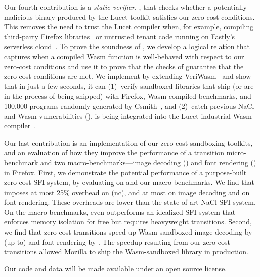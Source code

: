 %
Our fourth contribution is a \emph{static verifier}, \verifname, that checks
whether a potentially malicious binary produced by the Lucet toolkit
satisfies our zero-cost conditions.
%
This removes the need to trust the Lucet compiler when, for example,
compiling third-party Firefox libraries~\cite{rlbox} or untrusted tenant code
running on Fastly's serverless cloud~\cite{lucet-talk}.
%
To prove the soundness of \verifname, we develop a logical relation that
captures when a compiled Wasm function is well-behaved with respect
to our zero-cost conditions and use it to prove that the checks of
\verifname{} guarantee that the zero-cost conditions are met.
%
We implement \verifname by extending VeriWasm~\cite{veriwasm} 
and show that in just a few seconds, it can
%
(1)~verify sandboxed libraries that ship 
    (or are in the process of being shipped) with Firefox, 
    Wasm-compiled \SPECOhSix benchmarks, and 100,000 programs
    randomly generated by Csmith~\cite{csmith}, and 
%
(2)~catch previous NaCl and Wasm vulnerabilities ().
%
\verifname is being integrated into the Lucet industrial Wasm
compiler~\cite{verizero-integration}.

%
Our last contribution is an implementation of our zero-cost 
sandboxing toolkits, and an evaluation of how they improve 
the performance of a transition micro-benchmark and two 
macro-benchmarks\dash---image decoding (\libjpeg) 
and font rendering (\libgraphite) in Firefox.
%
First, we demonstrate the potential performance 
of a purpose-built zero-cost SFI system, by evaluating 
\trsegmentsfi on \SPECOhSix and our macro-benchmarks.
%
We find that \trsegmentsfi imposes at most 25\%
overhead on \SPECOhSix (nc), and at most \ffMaxImgOverheadSegzeroNative 
on image decoding and \ffMaxFontOverheadSegzeroNative on font rendering.
%
These overheads are lower than the state-of-art NaCl SFI system.
%
On the macro-benchmarks, \trsegmentsfi even outperforms an idealized SFI system
that enforces memory isolation for free but requires heavyweight transitions.
%
Second, we find that zero-cost transitions speed up 
Wasm-sandboxed image decoding by (up to) \ffMaxImgSpeedupWasmZeroHeavy 
and font rendering by \ffMaxFontSpeedupWasmZeroHeavy.
%
The speedup resulting from our zero-cost transitions allowed 
Mozilla to ship the Wasm-sandboxed \libgraphite library 
in production.

Our code and data will be made available under an open source license.
